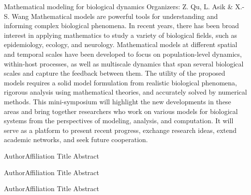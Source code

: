 \label{mini03}

\miniabs
{Mathematical modeling for biological dynamics}
{Organizers: Z. Qu,	L. Asik \& X.-S. Wang}
{Mathematical models are powerful tools for understanding and informing complex biological phenomena. In recent years, there has been broad interest in applying mathematics to study a variety of biological fields, such as epidemiology, ecology, and neurology. Mathematical models at different spatial and temporal scales have been developed to focus on population-level dynamics, within-host processes, as well as multiscale dynamics that span several biological scales and capture the feedback between them. The utility of the proposed models requires a solid model formulation from realistic biological phenomena, rigorous analysis using mathematical theories, and accurately solved by numerical methods. This mini-symposium will highlight the new developments in these areas and bring together researchers who work on various models for biological systems from the perspectives of modeling, analysis, and computation. It will serve as a platform to present recent progress, exchange research ideas, extend academic networks, and seek future cooperation.}
\vspace{2ex}



\abs
{Author}{Affiliation}
{Title}
{Abstract
}

\vspace{1.5ex}

\abs
{Author}{Affiliation}
{Title}
{Abstract
}

\vspace{1.5ex}

\abs
{Author}{Affiliation}
{Title}
{Abstract
}
